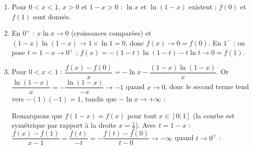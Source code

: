 \begin{enumerate}
   \item {}
      Pour $0 < x < 1$, $x > 0$ et $1 - x > 0$ : $\ln x$ et $\ln(1 - x)$ existent ; $f(0)$ et $f(1)$ sont donn\'es.
      \par\noindent{}
   \item {}
      En $0^+$ : $x\ln x \to 0$ (croissances compar\'ees) et $(1 - x)\ln(1 - x) \to 1 \times \ln 1 = 0$, donc $f(x) \to 0 = f(0)$.
      En $1^-$ : on pose $t = 1 - x \to 0^+$ ; $f(x) = -(1 - t)\ln(1 - t) - t\ln t \to 0 = f(1)$.
      \par\noindent{}
   \item {}
      Pour $0 < x < 1$ : $\dfrac{f(x) - f(0)}{x} = -\ln x - \dfrac{(1 - x)\ln(1 - x)}{x}$.
      Or $\dfrac{\ln(1 - x)}{x} = -\dfrac{\ln(1 - x)}{-x} \to -1$ quand $x \to 0$, donc le second terme tend vers $-(1)(-1) = 1$,
      tandis que $-\ln x \to +\infty$ : 

      Remarquons que $f(1 - x) = f(x)$ pour tout $x \in [0 ; 1]$ (la courbe est sym\'etrique par rapport \`a la droite $x = \frac{1}{2}$).
      Avec $t = 1 - x$ : $\dfrac{f(x) - f(1)}{x - 1} = \dfrac{f(t)}{-t} = -\dfrac{f(t) - f(0)}{t - 0} \to -\infty$ quand $t \to 0^+$ :


\end{enumerate}
